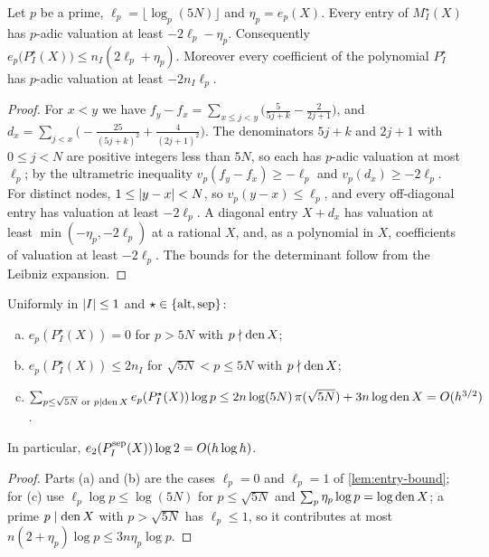 \begin{lemma}\label{lem:entry-bound}
Let $p$ be a prime, $\ell_p=\lfloor\log_p(5N)\rfloor$ and $\eta_p=e_p(X)$. Every entry of
$M^\star_I(X)$ has $p$-adic valuation at least $-2\ell_p-\eta_p$. Consequently
$e_p\bigl(P^\star_I(X)\bigr)\le n_I(2\ell_p+\eta_p)$. Moreover every coefficient of the
polynomial $P^\star_I$ has $p$-adic valuation at least $-2n_I\ell_p$.
\end{lemma}

\begin{proof}
For $x<y$ we have $f_y-f_x=\sum_{x\le j<y}\bigl(\frac5{5j+k}-\frac2{2j+1}\bigr)$, and
$d_x=\sum_{j<x}\bigl(-\frac{25}{(5j+k)^2}+\frac4{(2j+1)^2}\bigr)$. The denominators $5j+k$ and
$2j+1$ with $0\le j<N$ are positive integers less than $5N$, so each has $p$-adic valuation at
most $\ell_p$; by the ultrametric inequality $v_p(f_y-f_x)\ge-\ell_p$ and $v_p(d_x)\ge-2\ell_p$.
For distinct nodes, $1\le\lvert y-x\rvert<N$, so $v_p(y-x)\le\ell_p$, and every off-diagonal entry has
valuation at least $-2\ell_p$. A diagonal entry $X+d_x$ has valuation at least
$\min(-\eta_p,-2\ell_p)$ at a rational $X$, and, as a polynomial in $X$, coefficients of valuation
at least $-2\ell_p$. The bounds for the determinant follow from the Leibniz expansion.
\end{proof}

\begin{corollary}\label{cor:small-primes}
Uniformly in $\lvert I\rvert\le1$ and $\star\in\{\mathrm{alt},\mathrm{sep}\}$:
\begin{enumerate}[(a)]
  \item $e_p(P^\star_I(X))=0$ for $p>5N$ with $p\nmid\operatorname{den} X$;
  \item $e_p(P^\star_I(X))\le2n_I$ for $\sqrt{5N}<p\le5N$ with $p\nmid\operatorname{den} X$;
  \item $\sum_{p\le\sqrt{5N}\text{ or }p\mid\operatorname{den} X}e_p(P^\star_I(X))\log p
         \le2n\log(5N)\,\pi(\sqrt{5N})+3n\log\operatorname{den} X=O(h^{3/2})$.
\end{enumerate}
In particular, $e_2(P^{\mathrm{sep}}_I(X))\log2=O(h\log h)$.
\end{corollary}

\begin{proof}
Parts (a) and (b) are the cases $\ell_p=0$ and $\ell_p=1$ of \cref{lem:entry-bound}; for (c)
use $\ell_p\log p\le\log(5N)$ for $p\le\sqrt{5N}$ and $\sum_p\eta_p\log p=\log\operatorname{den} X$; a prime
$p\mid\operatorname{den} X$ with $p>\sqrt{5N}$ has $\ell_p\le1$, so it contributes at most
$n(2+\eta_p)\log p\le3n\eta_p\log p$.
\end{proof}

